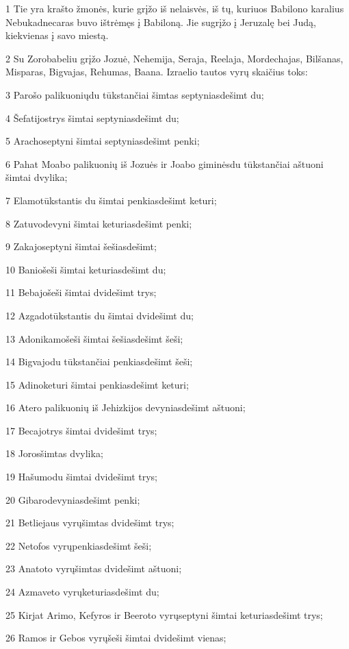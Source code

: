 \par 1 Tie yra krašto žmonės, kurie grįžo iš nelaisvės, iš tų, kuriuos Babilono karalius Nebukadnecaras buvo ištrėmęs į Babiloną. Jie sugrįžo į Jeruzalę bei Judą, kiekvienas į savo miestą. 
\par 2 Su Zorobabeliu grįžo Jozuė, Nehemija, Seraja, Reelaja, Mordechajas, Bilšanas, Misparas, Bigvajas, Rehumas, Baana. Izraelio tautos vyrų skaičius toks: 
\par 3 Parošo palikuonių­du tūkstančiai šimtas septyniasdešimt du; 
\par 4 Šefatijos­trys šimtai septyniasdešimt du; 
\par 5 Aracho­septyni šimtai septyniasdešimt penki; 
\par 6 Pahat Moabo palikuonių iš Jozuės ir Joabo giminės­du tūkstančiai aštuoni šimtai dvylika; 
\par 7 Elamo­tūkstantis du šimtai penkiasdešimt keturi; 
\par 8 Zatuvo­devyni šimtai keturiasdešimt penki; 
\par 9 Zakajo­septyni šimtai šešiasdešimt; 
\par 10 Banio­šeši šimtai keturiasdešimt du; 
\par 11 Bebajo­šeši šimtai dvidešimt trys; 
\par 12 Azgado­tūkstantis du šimtai dvidešimt du; 
\par 13 Adonikamo­šeši šimtai šešiasdešimt šeši; 
\par 14 Bigvajo­du tūkstančiai penkiasdešimt šeši; 
\par 15 Adino­keturi šimtai penkiasdešimt keturi; 
\par 16 Atero palikuonių iš Jehizkijos­ devyniasdešimt aštuoni; 
\par 17 Becajo­trys šimtai dvidešimt trys; 
\par 18 Joros­šimtas dvylika; 
\par 19 Hašumo­du šimtai dvidešimt trys; 
\par 20 Gibaro­devyniasdešimt penki; 
\par 21 Betliejaus vyrų­šimtas dvidešimt trys; 
\par 22 Netofos vyrų­penkiasdešimt šeši; 
\par 23 Anatoto vyrų­šimtas dvidešimt aštuoni; 
\par 24 Azmaveto vyrų­keturiasdešimt du; 
\par 25 Kirjat Arimo, Kefyros ir Beeroto vyrų­septyni šimtai keturiasdešimt trys; 
\par 26 Ramos ir Gebos vyrų­šeši šimtai dvidešimt vienas; 
